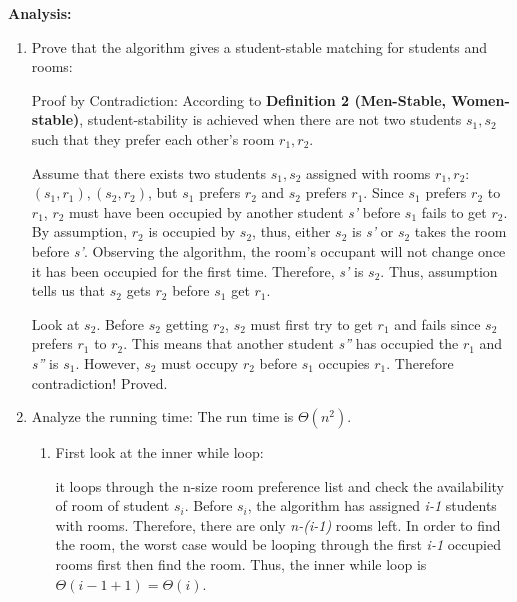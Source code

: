 \documentclass{article}
\begin{document}
\textbf{    Analysis:}
    \begin{enumerate}
        \item Prove that the algorithm gives a student-stable matching for students and rooms:
            
            Proof by Contradiction:
            According to \textbf{Definition 2 (Men-Stable, Women-stable)}, student-stability is achieved when there are not two students \textit{$s_1, s_2$} such that they prefer each other's room \textit{$r_1, r_2$}.
        
            Assume that there exists two students \textit{$s_1, s_2$} assigned with rooms \textit{$r_1, r_2$}: \textit{$(s_1, r_1), (s_2, r_2)$}, but \textit{$s_1$} prefers \textit{$r_2$} and \textit{$s_2$} prefers \textit{$r_1$}. Since \textit{$s_1$} prefers \textit{$r_2$} to \textit{$r_1$}, \textit{$r_2$} must have been occupied by another student \textit{s'} before \textit{$s_1$} fails to get \textit{$r_2$}. By assumption, \textit{$r_2$} is occupied by \textit{$s_2$}, thus, either \textit{$s_2$} is \textit{s'} or \textit{$s_2$} takes the room before \textit{s'}. Observing the algorithm, the room's occupant will not change once it has been occupied for the first time. Therefore, \textit{s'} is \textit{$s_2$}. Thus, assumption tells us that \textit{$s_2$} gets \textit{$r_2$} before \textit{$s_1$} get \textit{$r_1$}.
        
            Look at \textit{$s_2$}. Before \textit{$s_2$} getting \textit{$r_2$}, \textit{$s_2$} must first try to get \textit{$r_1$} and fails since \textit{$s_2$} prefers \textit{$r_1$} to \textit{$r_2$}. This means that another student \textit{s''} has occupied the \textit{$r_1$} and \textit{s''} is \textit{$s_1$}. However, \textit{$s_2$} must occupy \textit{$r_2$} before \textit{$s_1$} occupies \textit{$r_1$}. Therefore contradiction! Proved.

        

        \item Analyze the running time:
        The run time is $\Theta(n^2)$.
        \begin{enumerate}
            \item First look at the inner while loop:

            it loops through the n-size room preference list and check the availability of room of student \textit{$s_i$}. Before \textit{$s_i$}, the algorithm has assigned \textit{i-1} students with rooms. Therefore, there are only \textit{n-(i-1)} rooms left. In order to find the room, the worst case would be looping through the first \textit{i-1} occupied rooms first then find the room. Thus, the inner while loop is $\Theta(i-1+1) = \Theta(i)$.


\end{enumerate}
\end{enumerate}
\end{document}
